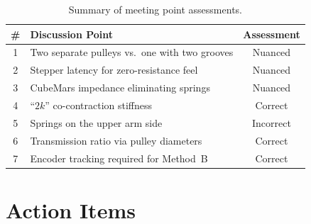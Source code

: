 \documentclass[11pt, a4paper]{article}
\begin{document}
\begin{table}[h]
\centering
\small
\begin{tabular}{@{}clc@{}}
\toprule
\textbf{\#} & \textbf{Discussion Point} & \textbf{Assessment} \\
\midrule
1 & Two separate pulleys vs.\ one with two grooves
  & \textcolor{orange!60!black}{Nuanced} \\
2 & Stepper latency for zero-resistance feel
  & \textcolor{orange!60!black}{Nuanced} \\
3 & CubeMars impedance eliminating springs
  & \textcolor{orange!60!black}{Nuanced} \\
4 & ``$2k$'' co-contraction stiffness
  & \textcolor{green!50!black}{Correct} \\
5 & Springs on the upper arm side
  & \textcolor{red!60!black}{Incorrect} \\
6 & Transmission ratio via pulley diameters
  & \textcolor{green!50!black}{Correct} \\
7 & Encoder tracking required for Method~B
  & \textcolor{green!50!black}{Correct} \\
\bottomrule
\end{tabular}
\caption{Summary of meeting point assessments.}
\label{tab:summary}
\end{table}


\section{Action Items}
\label{sec:actions}
\end{document}

